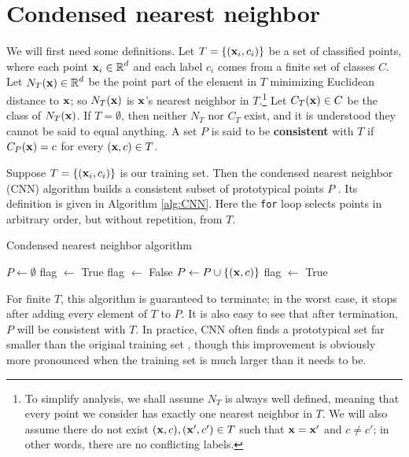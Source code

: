 \documentclass{article}
\newcommand{\R}{ \mbox{${\mathbb R}$}}
\begin{document}
\section{Condensed nearest neighbor}
We will first need some definitions. Let $T = \{ ({\bf x}_i, c_i) \}$ be a set of classified points, where each point ${\bf x}_i \in \R^d$ and each label $c_i$ comes from a finite set of classes $C$.
Let $N_T({\bf x}) \in \R^d$ be the point part of the element in $T$ minimizing Euclidean distance to ${\bf x}$; so $N_T({\bf x})$ is ${\bf x}$'s nearest neighbor in $T$.\footnote{To simplify analysis, we shall assume $N_T$ is always well defined, meaning that every point we consider has exactly one nearest neighbor in $T$. We will also assume there do not exist $({\bf x},c),({\bf x}',c') \in T$ such that ${\bf x} = {\bf x}'$ and $c \neq c'$; in other words, there are no conflicting labels.} Let $C_T({\bf x}) \in C$ be the class of $N_T({\bf x})$. If $T = \emptyset$, then neither $N_T$ nor $C_T$ exist, and it is understood they cannot be said to equal anything. A set $P$ is said to be \textbf{consistent} with $T$ if $C_P({\bf x}) = c$ for every $({\bf x},c) \in T$.

Suppose $T = \{({\bf x}_i,c_i )\}$ is our training set. Then the condensed nearest neighbor (CNN) algorithm builds a consistent subset of prototypical points $P$ \cite{HartCNN}. Its definition is given in Algorithm \ref{alg:CNN}. Here the \texttt{for} loop selects points in arbitrary order, but without repetition, from $T$.

\begin{algorithm}
\caption{Condensed nearest neighbor algorithm}
\label{alg:CNN}
\begin{algorithmic}
\STATE $P \leftarrow \emptyset$
\STATE flag $\leftarrow$ True
	\STATE flag $\leftarrow$ False
			\STATE $P \leftarrow P \cup \{({\bf x} , c)\}$
			\STATE flag $\leftarrow$ True
		\ENDIF
	\ENDFOR
\ENDWHILE
\end{algorithmic}
\end{algorithm}

For finite $T$, this algorithm is guaranteed to terminate; in the worst case, it stops after adding every element of $T$ to $P$. It is also easy to see that after termination, $P$ will be consistent with $T$. In practice, CNN often finds a prototypical set far smaller than the original training set \cite{Angiulli}\cite{Wilson}, though this improvement is obviously more pronounced when the training set is much larger than it needs to be.
\end{document}
